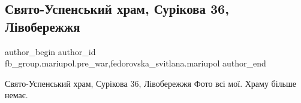  
 
 
 
 

\subsection{Свято-Успенський храм, Сурікова 36, Лівобережжя}
\label{sec:16_03_2023.fb.fb_group.mariupol.pre_war.2.svyato_uspenskii_khr}
 
\ifcmt
 author_begin
   author_id fb_group.mariupol.pre_war,fedorovska_svitlana.mariupol
 author_end
\fi

Свято-Успенський храм, Сурікова 36, Лівобережжя Фото всі мої. Храму більше немає.


